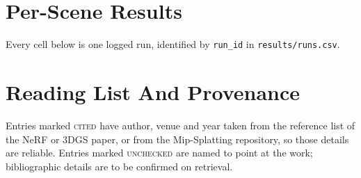 \chapter{Per-Scene Results}
\label{app:perscene}
Every cell below is one logged run, identified by \texttt{run\_id} in
\texttt{results/runs.csv}.



\chapter{Reading List And Provenance}
\label{app:reading}
Entries marked \textsc{cited} have author, venue and year taken from the
reference list of the NeRF or 3DGS paper, or from the Mip-Splatting repository,
so those details are reliable. Entries marked \textsc{unchecked} are named to
point at the work; bibliographic details are to be confirmed on retrieval.

